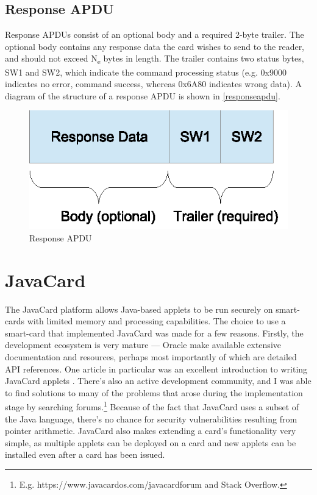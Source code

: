 \documentclass[12pt,a4paper,twoside,openright]{report}
\begin{document}
\subsection{Response APDU}

Response APDUs consist of an optional body and a required 2-byte trailer. The optional body contains any response data the card wishes to send to the reader, and should not exceed N\textsubscript{e} bytes in length. The trailer contains two status bytes, SW1 and SW2, which indicate the command processing status (e.g. 0x9000 indicates no error, command success, whereas 0x6A80 indicates wrong data). A diagram of the structure of a response APDU is shown in \autoref{responseapdu}.

\begin{figure}[tbh]
\centerline{\includegraphics{figures/responseapdu.eps}}
\caption{Response APDU}
\label{responseapdu}
\end{figure}

\section{JavaCard}

The JavaCard platform allows Java-based applets to be run securely on smart-cards with limited memory and processing capabilities. The choice to use a smart-card that implemented JavaCard was made for a few reasons. Firstly, the development ecosystem is very mature --- Oracle make available extensive documentation and resources, perhaps most importantly of which are detailed API references. One article in particular was an excellent introduction to writing JavaCard applets \cite{writingapplets}. There's also an active development community, and I was able to find solutions to many of the problems that arose during the implementation stage by searching forums.\footnote{E.g. https://www.javacardos.com/javacardforum and Stack Overflow.} Because of the fact that JavaCard uses a subset of the Java language, there's no chance for security vulnerabilities resulting from pointer arithmetic. JavaCard also makes extending a card's functionality very simple, as multiple applets can be deployed on a card and new applets can be installed even after a card has been issued.
\end{document}
